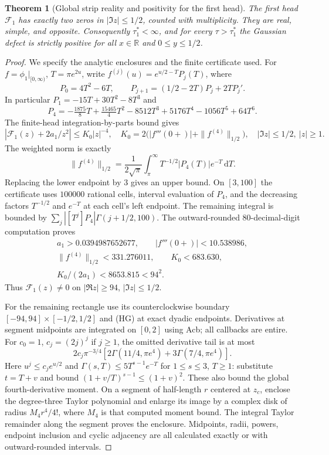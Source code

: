 \documentclass[11pt]{article}
\newtheorem{theorem}{Theorem}
\theoremstyle{remark}\newtheorem{remark}[theorem]{Remark}
\newcommand{\R}{\mathbb R}
\newcommand{\dd}{\,\mathrm d}
\begin{document}
\begin{theorem}[Global strip reality and positivity for the first head]
\label{thm:first-head-certificate}
The first head $\mathcal F_1$ has exactly two zeros in
$|\Im z|\le1/2$, counted with multiplicity. They are real, simple,
and opposite. Consequently $\tau_1^*<\infty$, and for every
$\tau>\tau_1^*$ the Gaussian defect is strictly positive for
all $x\in\R$ and $0\le y\le1/2$.
\end{theorem}
\begin{proof}
We specify the analytic enclosures and the finite certificate used.
For $f=\phi_1|_{[0,\infty)}$, $T=\pi e^{2u}$, write
$f^{(j)}(u)=e^{u/2-T}P_j(T)$, where
\[
 P_0=4T^2-6T,\qquad
 P_{j+1}=(1/2-2T)P_j+2TP_j'.
\]
In particular $P_1=-15T+30T^2-8T^3$ and
\[
 P_4=-\tfrac{1875}{8}T+\tfrac{15465}{4}T^2-8512T^3
                                      +5176T^4-1056T^5+64T^6.
\]
The finite-head integration-by-parts bound gives
\[
 |\mathcal F_1(z)+2a_1/z^2|\le K_0|z|^{-4},\quad
 K_0=2\bigl(|f'''(0+)|+\|f^{(4)}\|_{1/2}\bigr),
 \quad |\Im z|\le1/2,\ |z|\ge1 .
\]
The weighted norm is exactly
\[
 \|f^{(4)}\|_{1/2}
 =\frac1{2\sqrt\pi}\int_\pi^\infty
                  T^{-1/2}|P_4(T)|e^{-T}\dd T.
\]
Replacing the lower endpoint by $3$ gives an upper bound.
On $[3,100]$ the certificate uses $100000$ rational cells,
interval evaluation of $P_4$, and the decreasing factors
$T^{-1/2}$ and $e^{-T}$ at each cell's left endpoint.
The remaining integral is bounded by
$\sum_j|[T^j]P_4|\Gamma(j+1/2,100)$.
The outward-rounded 80-decimal-digit computation proves
\[
 \begin{gathered}
 a_1>0.0394987652677,\qquad |f'''(0+)|<10.538986,\\
 \|f^{(4)}\|_{1/2}<331.276011,\qquad K_0<683.630,\\
 K_0/(2a_1)<8653.815<94^2.
 \end{gathered}
\]
Thus $\mathcal F_1(z)\ne0$ on $|\Re z|\ge94$, $|\Im z|\le1/2$.

For the remaining rectangle use its counterclockwise boundary
$[-94,94]\times[-1/2,1/2]$ and (HG) at exact dyadic endpoints.
Derivatives at segment midpoints are integrated on $[0,2]$ using
Acb; all callbacks are entire. For $c_0=1$, $c_j=(2j)^j$ if $j\ge1$,
the omitted derivative tail is at most
\[
 2c_j\pi^{-3/4}
       [2\Gamma(11/4,\pi e^4)+3\Gamma(7/4,\pi e^4)] .
\]
Here $u^j\le c_je^{u/2}$ and
$\Gamma(s,T)\le5T^{s-1}e^{-T}$ for $1\le s\le3$, $T\ge1$:
substitute $t=T+v$ and bound $(1+v/T)^{s-1}\le(1+v)^2$.
These also bound the global fourth-derivative moment.
On a segment of half-length $r$ centered at $z_c$, enclose the
degree-three Taylor polynomial and enlarge its image by a complex disk
of radius $M_4r^4/4!$, where $M_4$ is that computed moment bound.
The integral Taylor remainder along the segment proves the enclosure.
Midpoints, radii, powers, endpoint inclusion and cyclic adjacency
are all calculated exactly or with outward-rounded intervals.


\end{proof}
\end{document}
